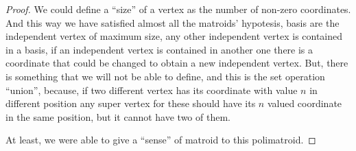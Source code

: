 \begin{proof}
        We could define a ``size'' of a vertex as the number of non-zero coordinates. And this way we have satisfied almost all the matroids' hypotesis, basis
        are the independent vertex of maximum size, any other independent vertex is contained in a basis, if an independent vertex is contained in another one
        there is a coordinate that could be changed to obtain a new independent vertex. But, there is something that we will not be able to define, and this is
        the set operation ``union'', because, if two different vertex has its coordinate with value $n$ in different position any super vertex for these should have
        its $n$ valued coordinate in the same position, but it cannot have two of them.\pn
        
        At least, we were able to give a ``sense'' of matroid to this polimatroid.\pn        
    \end{proof}